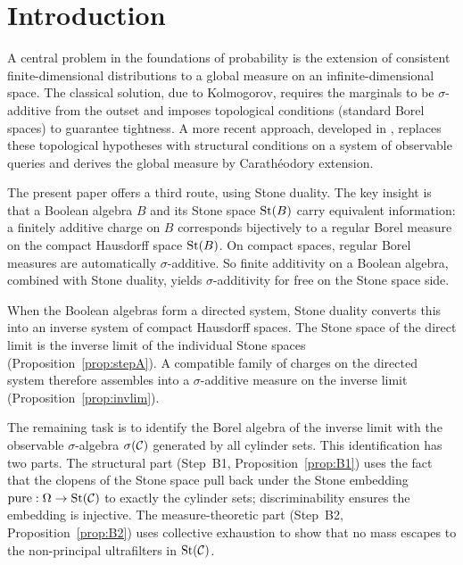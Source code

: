 \section{Introduction}

A central problem in the foundations of probability is the extension of consistent
finite-dimensional distributions to a global measure on an infinite-dimensional space.
The classical solution, due to Kolmogorov, requires the marginals to be $\sigma$-additive
from the outset and imposes topological conditions (standard Borel spaces) to guarantee
tightness.  A more recent approach, developed in \cite{mahon_paper0}, replaces these
topological hypotheses with structural conditions on a system of observable queries and
derives the global measure by Carath\'{e}odory extension.

The present paper offers a third route, using Stone duality.  The key insight is that
a Boolean algebra $B$ and its Stone space $\mathrm{St}(B)$ carry equivalent information: a
finitely additive charge on $B$ corresponds bijectively to a regular Borel measure on
the compact Hausdorff space $\mathrm{St}(B)$.  On compact spaces, regular Borel measures are
automatically $\sigma$-additive.  So finite additivity on a Boolean algebra, combined
with Stone duality, yields $\sigma$-additivity for free on the Stone space side.

When the Boolean algebras form a directed system, Stone duality converts this into an
inverse system of compact Hausdorff spaces.  The Stone space of the direct limit is the
inverse limit of the individual Stone spaces (Proposition~\ref{prop:stepA}).  A
compatible family of charges on the directed system therefore assembles into a
$\sigma$-additive measure on the inverse limit (Proposition~\ref{prop:invlim}).

The remaining task is to identify the Borel algebra of the inverse limit with the
observable $\sigma$-algebra $\sigma(\mathcal{C})$ generated by all cylinder sets.  This
identification has two parts.  The structural part (Step~B1,
Proposition~\ref{prop:B1}) uses the fact that the clopens of the Stone space pull back
under the Stone embedding $\mathrm{pure} : \Omega \to \mathrm{St}(\mathcal{C})$ to exactly the cylinder
sets; discriminability ensures the embedding is injective.  The measure-theoretic part
(Step~B2, Proposition~\ref{prop:B2}) uses collective exhaustion to show that no mass
escapes to the non-principal ultrafilters in $\mathrm{St}(\mathcal{C})$.

